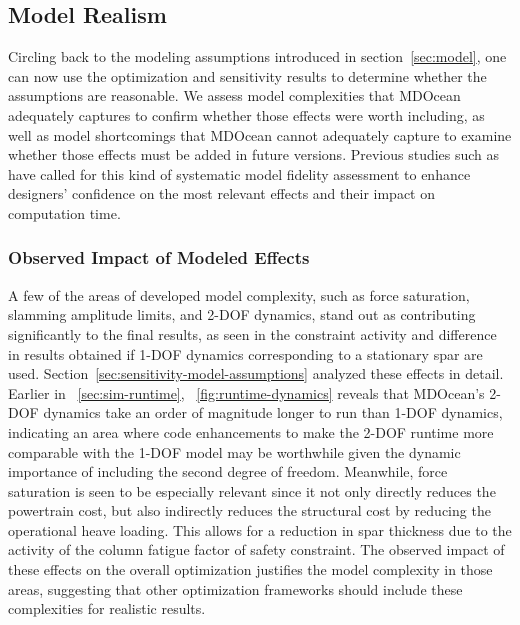 \subsection{Model Realism}
Circling back to the modeling assumptions introduced in section~\ref{sec:model}, one can now use the optimization and sensitivity results to determine whether the assumptions are reasonable. We assess model complexities that MDOcean adequately captures to confirm whether those effects were worth including, as well as model shortcomings that MDOcean cannot adequately capture to examine whether those effects must be added in future versions. Previous studies such as \cite{garcia-teruel_reliability-based_2021} have called for this kind of systematic model fidelity assessment to enhance designers' confidence on the most relevant effects and their impact on computation time.

\subsubsection{Observed Impact of Modeled Effects}
A few of the areas of developed model complexity, such as force saturation, slamming amplitude limits, and 2-DOF dynamics, stand out as contributing significantly to the final results, as seen in the constraint activity and difference in results obtained if 1-DOF dynamics corresponding to a stationary spar are used. Section~\ref{sec:sensitivity-model-assumptions} analyzed these effects in detail. Earlier in \sectionautorefname~\ref{sec:sim-runtime}, \figureautorefname~\ref{fig:runtime-dynamics} reveals that MDOcean's 2-DOF dynamics take an order of magnitude longer to run than 1-DOF dynamics, indicating an area where code enhancements to make the 2-DOF runtime more comparable with the 1-DOF model may be worthwhile given the dynamic importance of including the second degree of freedom. 
Meanwhile, force saturation is seen to be especially relevant since it not only directly reduces the powertrain cost, but also indirectly reduces the structural cost by reducing the operational heave loading. This allows for a reduction in spar thickness due to the activity of the column fatigue factor of safety constraint. 
The observed impact of these effects on the overall optimization justifies the model complexity in those areas, suggesting that other optimization frameworks should include these complexities for realistic results.


